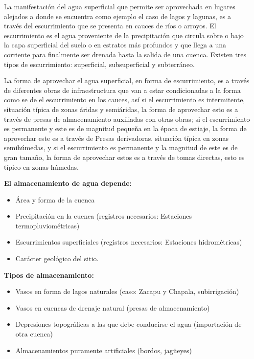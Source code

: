La manifestación del agua superficial que permite ser aprovechada en lugares
alejados a donde se encuentra como ejemplo el caso de lagos y lagunas, es a través
del escurrimiento que se presenta en cauces de ríos o arroyos. El escurrimiento es el
agua proveniente de la precipitación que circula sobre o bajo la capa superficial del
suelo o en estratos más profundos y que llega a una corriente para finalmente ser
drenada hasta la salida de una cuenca. Existen tres tipos de escurrimiento: superficial,
subsuperficial y subterráneo.

La forma de aprovechar el agua superficial, en forma de escurrimiento, es a
través de diferentes obras de infraestructura que van a estar condicionadas a la forma
como se de el escurrimiento en los cauces, así si el escurrimiento es intermitente,
situación típica de zonas áridas y semiáridas, la forma de aprovechar esto es a través
de presas de almacenamiento auxiliadas con otras obras; si el escurrimiento es
permanente y este es de magnitud pequeña en la época de estiaje, la forma de
aprovechar este es a través de Presas derivadoras, situación típica en zonas
semihúmedas, y si el escurrimiento es permanente y la magnitud de este es de gran
tamaño, la forma de aprovechar estos es a través de tomas directas, esto es típico en
zonas húmedas.

\textbf{El almacenamiento de agua depende:}
\begin{itemize}
	\item Área y forma de la cuenca
	\item Precipitación en la cuenca (registros necesarios: Estaciones termopluviométricas)
	\item Escurrimientos superficiales (registros necesarios: Estaciones hidrométricas)
	\item Carácter geológico del sitio.
\end{itemize}

\textbf{Tipos de almacenamiento:}
\begin{itemize}
	\item Vasos en forma de lagos naturales (caso: Zacapu y Chapala, subirrigación)
	\item Vasos en cuencas de drenaje natural (presas de almacenamiento)
	\item Depresiones topográficas a las que debe conducirse el agua (importación de otra
	      cuenca)
	\item Almacenamientos puramente artificiales (bordos, jagüeyes)
\end{itemize}

